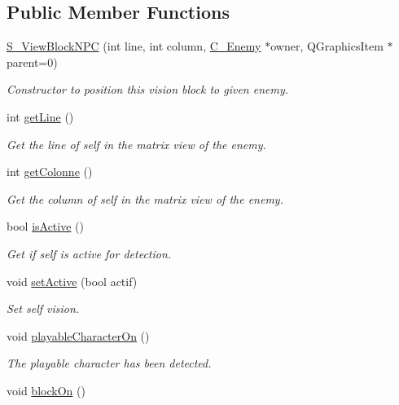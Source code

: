 \subsection*{Public Member Functions}
\begin{DoxyCompactItemize}
\item 
\hyperlink{class_s___view_block_n_p_c_a505d9eb8092ca4fdf3a8662418dd6511}{S\+\_\+\+View\+Block\+N\+P\+C} (int line, int column, \hyperlink{class_c___enemy}{C\+\_\+\+Enemy} $\ast$owner, Q\+Graphics\+Item $\ast$parent=0)
\begin{DoxyCompactList}\small\item\em Constructor to position this vision block to given enemy. \end{DoxyCompactList}\item 
int \hyperlink{class_s___view_block_n_p_c_a32c2bf2773dfb42611e5b029a98f9b3f}{get\+Line} ()
\begin{DoxyCompactList}\small\item\em Get the line of self in the matrix view of the enemy. \end{DoxyCompactList}\item 
int \hyperlink{class_s___view_block_n_p_c_ab6a88434bbcb808b801994bc320b5981}{get\+Colonne} ()
\begin{DoxyCompactList}\small\item\em Get the column of self in the matrix view of the enemy. \end{DoxyCompactList}\item 
bool \hyperlink{class_s___view_block_n_p_c_a59c007ce0c4eaae6e361f65bb7782289}{is\+Active} ()
\begin{DoxyCompactList}\small\item\em Get if self is active for detection. \end{DoxyCompactList}\item 
void \hyperlink{class_s___view_block_n_p_c_aa8cc7f8d5958a998ce6eb7db6b20031a}{set\+Active} (bool actif)
\begin{DoxyCompactList}\small\item\em Set self vision. \end{DoxyCompactList}\item 
\hypertarget{class_s___view_block_n_p_c_aaa7984976e743660e694b860cc6122de}{}void \hyperlink{class_s___view_block_n_p_c_aaa7984976e743660e694b860cc6122de}{playable\+Character\+On} ()\label{class_s___view_block_n_p_c_aaa7984976e743660e694b860cc6122de}

\begin{DoxyCompactList}\small\item\em The playable character has been detected. \end{DoxyCompactList}\item 
\hypertarget{class_s___view_block_n_p_c_a97f4bbd45d4768a2cf7b31ec36197ef1}{}void \hyperlink{class_s___view_block_n_p_c_a97f4bbd45d4768a2cf7b31ec36197ef1}{block\+On} ()\label{class_s___view_block_n_p_c_a97f4bbd45d4768a2cf7b31ec36197ef1}


\end{DoxyCompactItemize}
